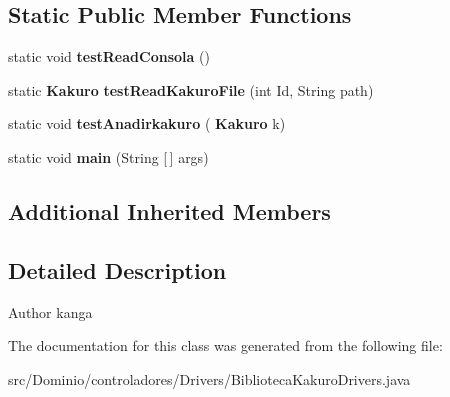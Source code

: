 \subsection*{Static Public Member Functions}
\begin{DoxyCompactItemize}
\item 
\mbox{\label{class_dominio_1_1controladores_1_1_drivers_1_1_biblioteca_kakuro_drivers_a401b00d17e67956be4b9385c6346ca2f}} 
static void {\bfseries test\+Read\+Consola} ()
\item 
\mbox{\label{class_dominio_1_1controladores_1_1_drivers_1_1_biblioteca_kakuro_drivers_a748557978e2f2d45c9933193f4d662fd}} 
static \textbf{ Kakuro} {\bfseries test\+Read\+Kakuro\+File} (int Id, String path)
\item 
\mbox{\label{class_dominio_1_1controladores_1_1_drivers_1_1_biblioteca_kakuro_drivers_a1ec4ad67cae52fb8dc8a79abf41839a0}} 
static void {\bfseries test\+Anadirkakuro} (\textbf{ Kakuro} k)
\item 
\mbox{\label{class_dominio_1_1controladores_1_1_drivers_1_1_biblioteca_kakuro_drivers_a31b15a500be1892e96d81c271adffacb}} 
static void {\bfseries main} (String [$\,$] args)
\end{DoxyCompactItemize}
\subsection*{Additional Inherited Members}


\subsection{Detailed Description}
\begin{DoxyAuthor}{Author}
kanga 
\end{DoxyAuthor}


The documentation for this class was generated from the following file\+:\begin{DoxyCompactItemize}
\item 
src/\+Dominio/controladores/\+Drivers/Biblioteca\+Kakuro\+Drivers.\+java\end{DoxyCompactItemize}
